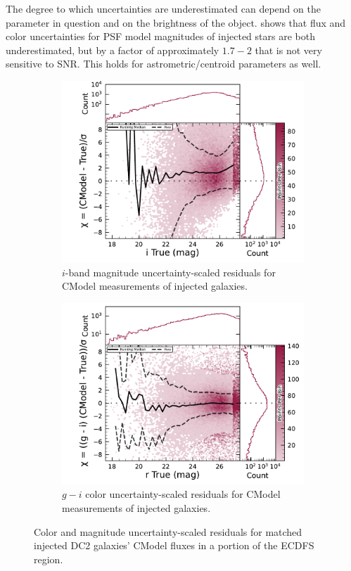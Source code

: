 The degree to which uncertainties are underestimated can depend on the parameter in question and on the brightness of the object.
 shows that flux and color uncertainties for PSF model magnitudes of injected stars are both underestimated, but by a factor of approximately $1.7-2$ that is not very sensitive to \gls{SNR}.
This holds for astrometric/centroid parameters as well.

\begin{figure}[hbt!]
  \centering
  \begin{subfigure}[t]{0.45\textwidth}
  \includegraphics[width=\linewidth]{injected_lsst_cells_v1_5063_i_mag_chi_cmodel}
  \caption{$i$-band magnitude uncertainty-scaled residuals for CModel measurements of injected galaxies.}
  \end{subfigure}\hfill
  \begin{subfigure}[t]{0.45\textwidth}
  \includegraphics[width=\linewidth]{injected_lsst_cells_v1_5063_r_color_chi_cmodel_g_minus_i}
  \caption{$g-i$ color uncertainty-scaled residuals for CModel measurements of injected galaxies.}
  \end{subfigure}\hfill
\caption{Color and magnitude uncertainty-scaled residuals for matched injected DC2 galaxies' CModel fluxes in a portion of the \gls{ECDFS} region.}
\label{fig:injected_lsst_cells_v1_5063_galaxy_cmodel_chi}
\end{figure}

